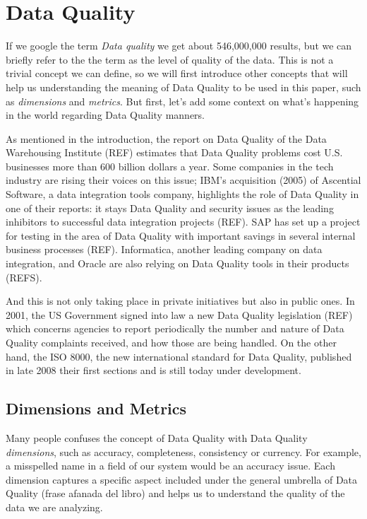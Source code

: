 \documentclass[%
 reprint,
 amsmath,amssymb,
 aps,
]{revtex4-1}
\begin{document}
\section{\label{sec:level1}Data Quality}

If we google the term \emph{Data quality} we get about 546,000,000 results, but we can briefly refer to the the term as the level of quality of the data. This is not a trivial concept we can define, so we will first introduce other concepts that will help us understanding the meaning of Data Quality to be used in this paper, such as \emph{dimensions} and \emph{metrics}. But first, let's add some context on what's happening in the world regarding Data Quality manners.

As mentioned in the introduction, the report on Data Quality of the Data Warehousing Institute (REF) estimates that Data Quality problems cost U.S. businesses more than 600 billion dollars a year. Some companies in the tech industry are rising their voices on this issue; IBM's acquisition (2005) of Ascential Software, a data integration tools company, highlights the role of Data Quality in one of their reports: it stays Data Quality and security issues as the leading inhibitors to successful data integration projects (REF). SAP has set up a project for testing in the area of Data Quality with important savings in several internal business processes (REF). Informatica, another leading company on data integration, and Oracle are also relying on Data Quality tools in their products (REFS).

And this is not only taking place in private initiatives but also in public ones. In 2001, the US Government signed into law a new Data Quality legislation (REF) which concerns agencies to report periodically the number and nature of Data Quality complaints received, and how those are being handled. On the other hand, the ISO 8000, the new international standard for Data Quality, published in late 2008 their first sections and is still today under development.

\subsection{\label{sec:level1}Dimensions and Metrics}

Many people confuses the concept of Data Quality with Data Quality \emph{dimensions}, such as accuracy, completeness, consistency or currency. For example, a misspelled name in a field of our system would be an accuracy issue. Each dimension captures a specific aspect included under the general umbrella of Data Quality (frase afanada del libro) and helps us to understand the quality of the data we are analyzing. 
\end{document}
